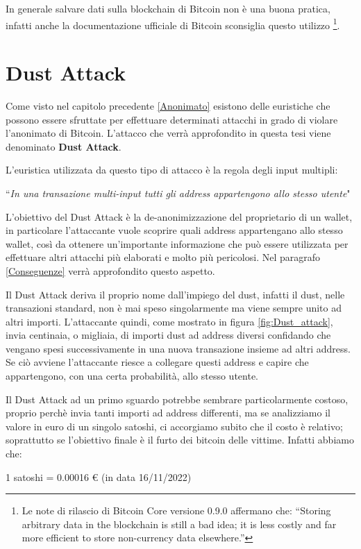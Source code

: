 In generale salvare dati sulla blockchain di Bitcoin non è una buona pratica, infatti anche la documentazione ufficiale di Bitcoin sconsiglia questo utilizzo \footnote{Le note di rilascio di  Bitcoin Core versione 0.9.0 affermano che: “Storing arbitrary data in the blockchain is still a bad idea; it is less costly and far more efficient to store non-currency data elsewhere.”}.
\section{Dust Attack}
Come visto nel capitolo precedente \ref{Anonimato} esistono delle euristiche che possono essere sfruttate per effettuare determinati attacchi in grado di violare l'anonimato di Bitcoin. L'attacco che verrà approfondito in questa tesi viene denominato \textbf{Dust Attack}. 

L'euristica utilizzata da questo tipo di attacco è la regola degli input multipli:
\begin{center}
    ``\textit{In una transazione multi-input tutti gli address appartengono allo stesso utente}"
\end{center}
L'obiettivo del Dust Attack è la de-anonimizzazione del proprietario di un wallet, in particolare l'attaccante vuole scoprire quali address appartengano allo stesso wallet, così da ottenere un'importante informazione che può essere utilizzata per effettuare altri attacchi più elaborati e molto più pericolosi. Nel paragrafo \ref{Conseguenze} verrà approfondito questo aspetto.

Il Dust Attack deriva il proprio nome dall'impiego del dust, infatti il dust, nelle transazioni standard, non è mai speso singolarmente ma viene sempre unito ad altri importi. L'attaccante quindi, come mostrato in figura \ref{fig:Dust_attack}, invia centinaia, o migliaia, di importi dust ad address diversi confidando che vengano spesi successivamente in una nuova transazione insieme ad altri address. Se ciò avviene l'attaccante riesce a collegare questi address e capire che appartengono, con una certa probabilità, allo stesso utente. 

Il Dust Attack ad un primo sguardo potrebbe sembrare particolarmente costoso, proprio perchè invia tanti importi ad address differenti, ma se analizziamo il valore in euro di un singolo satoshi, ci accorgiamo subito che il costo è relativo; soprattutto se l'obiettivo finale è il furto dei bitcoin delle vittime. Infatti abbiamo che:
\begin{center}
    1 satoshi = 0.00016 € (in data 16/11/2022) 
\end{center}

